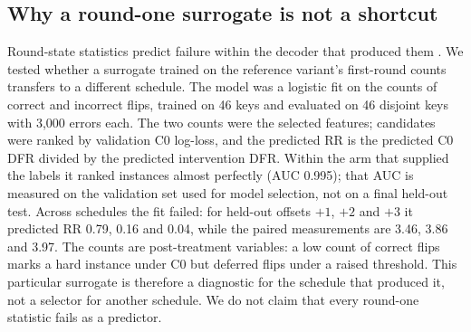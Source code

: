 \subsection{Why a round-one surrogate is not a shortcut}\label{sec:counterfactual}

Round-state statistics predict failure within the decoder that produced them \cite{kim2021logistic,paiva2022pickyfix}. We tested whether a surrogate trained on the reference variant's first-round counts transfers to a different schedule. The model was a logistic fit on the counts of correct and incorrect flips, trained on 46 keys and evaluated on 46 disjoint keys with 3,000 errors each. The two counts were the selected features; candidates were ranked by validation C0 log-loss, and the predicted RR is the predicted C0 DFR divided by the predicted intervention DFR. Within the arm that supplied the labels it ranked instances almost perfectly (AUC 0.995); that AUC is measured on the validation set used for model selection, not on a final held-out test. Across schedules the fit failed: for held-out offsets $+1$, $+2$ and $+3$ it predicted RR 0.79, 0.16 and 0.04, while the paired measurements are 3.46, 3.86 and 3.97. The counts are post-treatment variables: a low count of correct flips marks a hard instance under C0 but deferred flips under a raised threshold. This particular surrogate is therefore a diagnostic for the schedule that produced it, not a selector for another schedule. We do not claim that every round-one statistic fails as a predictor.
